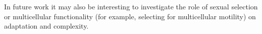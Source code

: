 In future work it may also be interesting to investigate the role of sexual selection or multicellular functionality (for example, selecting for multicellular motility) on adaptation and complexity.

